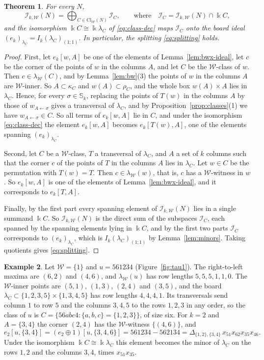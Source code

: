 \documentclass[11pt]{amsart}
\newtheorem{theorem}{Theorem}[section]
\theoremstyle{definition}
\newtheorem{example}[theorem]{Example}
\theoremstyle{remark}
\newcommand{\bS}{\mathbb{S}}
\newcommand{\kk}{\Bbbk}
\newcommand{\Cl}{\mathrm{Cl}}
\newcommand{\cI}{\mathscr{I}}
\newcommand{\cW}{\mathcal{W}}
\begin{document}
\begin{theorem}\label{thm:splitting}
For every $N$,
\[
\cI_{k,\cW}(N)=\bigoplus_{C\in\Cl_\cW(N)}\cI_C,\qquad\text{where}\quad\cI_C=\cI_{k,\cW}(N)\cap\kk C,
\]
and the isomorphism $\kk C\cong\kk\lambda_C$ of \eqref{eq:class-dec} maps $\cI_C$ onto the board ideal $(e_k)_{\lambda_C}=I_k(\lambda_C)_{(1;1)}$. In particular, the splitting \eqref{eq:splitting} holds.
\end{theorem}

\begin{proof}
First, let $e_k[w,A]$ be one of the elements of Lemma~\ref{lem:bwx-ideal}, let $c$ be the corner of the points of $w$ in the columns $A$, and let $C$ be the $\cW$-class of $w$. Then $c\in\lambda_\cW(C)$, and by Lemma~\ref{lem:bw}(3) the points of $w$ in the columns $A$ are $\cW$-inner. So $A\subset\kappa_C$ and $w(A)\subset\rho_C$, and the whole box $w(A)\times A$ lies in $\lambda_C$. Hence, for every $\sigma\in\bS_k$, replacing the points of $T(w)$ in the columns $A$ by those of $w_{A\leftarrow\sigma}$ gives a transversal of $\lambda_C$, and by Proposition~\ref{prop:classes}(1) we have $w_{A\leftarrow\sigma}\in C$. So all terms of $e_k[w,A]$ lie in $C$, and under the isomorphism \eqref{eq:class-dec} the element $e_k[w,A]$ becomes $e_k[T(w),A]$, one of the elements spanning $(e_k)_{\lambda_C}$.

Second, let $C$ be a $\cW$-class, $T$ a transversal of $\lambda_C$, and $A$ a set of $k$ columns such that the corner $c$ of the points of $T$ in the columns $A$ lies in $\lambda_C$. Let $w\in C$ be the permutation with $T(w)=T$. Then $c\in\lambda_\cW(w)$, that is, $c$ has a $\cW$-witness in $w$. So $e_k[w,A]$ is one of the elements of Lemma~\ref{lem:bwx-ideal}, and it corresponds to $e_k[T,A]$.

Finally, by the first part every spanning element of $\cI_{k,\cW}(N)$ lies in a single summand $\kk C$. So $\cI_{k,\cW}(N)$ is the direct sum of the subspaces $\cI_C$, each spanned by the spanning elements lying in $\kk C$, and by the first two parts $\cI_C$ corresponds to $(e_k)_{\lambda_C}$, which is $I_k(\lambda_C)_{(1;1)}$ by Lemma~\ref{lem:minors}. Taking quotients gives \eqref{eq:splitting}.
\end{proof}

\begin{example}\label{ex:splitting}
Let $\cW=\{1\}$ and $u=561234$ (Figure~\ref{fig:tau1}). The right-to-left maxima are $(6,2)$ and $(4,6)$, and $\lambda_\cW(u)$ has row lengths $5,5,5,1,1,0$. The $\cW$-inner points are $(5,1)$, $(1,3)$, $(2,4)$ and $(3,5)$, and the board $\lambda_C\subset\{1,2,3,5\}\times\{1,3,4,5\}$ has row lengths $4,4,4,1$. Its transversals send column $1$ to row $5$ and the columns $3,4,5$ to the rows $1,2,3$ in any order, so the class of $u$ is $C=\{56abc4:\{a,b,c\}=\{1,2,3\}\}$, of size six. For $k=2$ and $A=\{3,4\}$ the corner $(2,4)$ has the $\cW$-witness $\{(4,6)\}$, and
\[
e_2[u,\{3,4\}]=(e_2\oplus1)[u,\{3,4,6\}]=561234-562134=\Delta_{\{1,2\},\{3,4\}}\,x_{51}x_{62}x_{35}x_{46}.
\]
Under the isomorphism $\kk C\cong\kk\lambda_C$ this element becomes the minor of $\lambda_C$ on the rows $1,2$ and the columns $3,4$, times $x_{51}x_{35}$.
\end{example}
\end{document}

